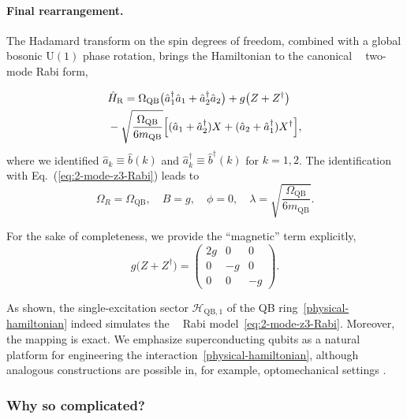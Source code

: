 \documentclass[reprint, aps, prx, amsmath, amssymb, longbibliography, superscriptaddress]{revtex4-2}
\DeclareMathOperator{\Zthree}{\mathbb{Z}_3}
\begin{document}
\paragraph{Final rearrangement.}
The Hadamard transform on the spin degrees of freedom, combined with a global
bosonic $\mathrm{U(1)}$ phase rotation, brings the Hamiltonian to the canonical
$\Zthree$ two-mode Rabi form,

\begin{align}
\label{effective-rabi}
    &\hat H_{\text{R}} = \Omega_{\text{QB}}
      \bigl( \hat a^{\dagger}_1 \hat a_1 + \hat a^{\dagger}_2 \hat a_2 \bigr)
      + g \bigl( Z + Z^{\dagger} \bigr) \notag
      \\
      &- \sqrt{ \frac{\Omega_{\text{QB}}}{6 m_{\text{QB}}} }
      \Bigl[ ( \hat a_1 + \hat a^{\dagger}_2 ) X
        + ( \hat a_2 + \hat a^{\dagger}_1 ) X^{\dagger} \Bigr],
\end{align}
where we identified $\hat a_k \equiv \hat b(k)$ and $\hat a_k^{\dagger} \equiv \hat b^{\dagger}(k)$ for $k = 1,2$. The identification with Eq.~(\ref{eq:2-mode-z3-Rabi}) leads to
\begin{equation}
\label{QB-RM-parameter-mapping}
  \Omega_R = \Omega_{\text{QB}},
  \quad B = g,
  \quad \phi = 0,
  \quad \lambda = \sqrt{ \frac{\Omega_{\text{QB}}}{6 m_{\text{QB}}} }.
\end{equation}

For the sake of completeness, we provide the ``magnetic'' term explicitly,
\begin{equation}
\label{superconducting-magnetic-term}
  g \bigl( Z + Z^{\dagger} \bigr) =
  \begin{pmatrix}
    2 g & 0 & 0 \\
    0 & -g & 0 \\
    0 & 0 & -g
  \end{pmatrix}.
\end{equation}

As shown, the single-excitation sector $\mathcal{H}_{\text{QB},1}$ of the QB ring~\eqref{physical-hamiltonian} indeed simulates the $\Zthree$ Rabi model~\eqref{eq:2-mode-z3-Rabi}. Moreover, the mapping is exact. We emphasize superconducting qubits as a natural platform for engineering the
interaction~\eqref{physical-hamiltonian}, although analogous constructions are
possible in, for example, optomechanical settings \cite{sedov_chiral_2020}.


\subsubsection{Why so complicated?}
\end{document}

